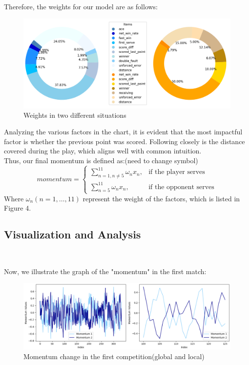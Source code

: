 \indent Therefore, the weights for our model are as follows:


\begin{figure}[H]
    \centering
    \includegraphics[scale=0.65]{mainmatter/imgs/7.png}
    \caption{Weights in two different situations}
\end{figure}

Analyzing the various factors in the chart, it is evident that the most impactful factor is 
whether the previous point was scored. Following closely is the distance covered during the 
play, which aligns well with common intuition.\\

Thus, our final momentum is defined as:(need to change symbol)
$$momentum=\begin{cases}
    \sum\limits_{n=1,n\neq 5}^{11}\omega_n x_n, & \text{if the player serves}  \\
    \sum\limits_{n=5}^{11}\omega_n x_n, & \text{if the opponent serves}
\end{cases}$$
Where $\omega_n(n=1,\dots,11)$ represent the weight of the factors, which is listed in Figure 4.\\

\subsection{Visualization and Analysis}~{}

Now, we illustrate the graph of the "momentum" in the first match:

\begin{figure}[H]
    \centering
    \includegraphics[scale=0.65]{mainmatter/imgs/5.png}
    \caption{Momentum change in the first competition(global and local)}
\end{figure}


